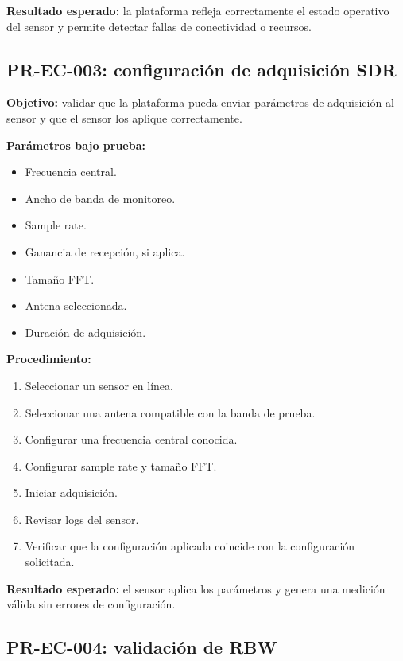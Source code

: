 \textbf{Resultado esperado:} la plataforma refleja correctamente el estado operativo del sensor y permite detectar fallas de conectividad o recursos.

\subsection{PR-EC-003: configuración de adquisición SDR}

\textbf{Objetivo:} validar que la plataforma pueda enviar parámetros de adquisición al sensor y que el sensor los aplique correctamente.

\textbf{Parámetros bajo prueba:}

\begin{itemize}
    \item Frecuencia central.
    \item Ancho de banda de monitoreo.
    \item Sample rate.
    \item Ganancia de recepción, si aplica.
    \item Tamaño FFT.
    \item Antena seleccionada.
    \item Duración de adquisición.
\end{itemize}

\textbf{Procedimiento:}

\begin{enumerate}
    \item Seleccionar un sensor en línea.
    \item Seleccionar una antena compatible con la banda de prueba.
    \item Configurar una frecuencia central conocida.
    \item Configurar sample rate y tamaño FFT.
    \item Iniciar adquisición.
    \item Revisar logs del sensor.
    \item Verificar que la configuración aplicada coincide con la configuración solicitada.
\end{enumerate}

\textbf{Resultado esperado:} el sensor aplica los parámetros y genera una medición válida sin errores de configuración.

\subsection{PR-EC-004: validación de RBW}

